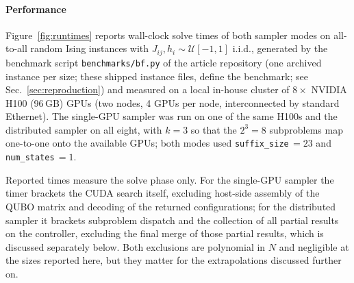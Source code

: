 \documentclass[preprint,12pt,a4paper]{elsarticle}
\begin{document}
\paragraph{Performance}
Figure~\ref{fig:runtimes} reports wall-clock solve times of both sampler modes on
all-to-all random Ising instances with $J_{ij},h_i\sim \mathcal{U}[-1,1]$ i.i.d.,
generated by the benchmark script \texttt{benchmarks/bf.py} of the article repository
(one archived instance per size; these shipped instance files,
define the benchmark; see Sec.~\ref{sec:reproduction}) and measured on a local
in-house cluster of $8\times$ NVIDIA H100 (96\,GB) GPUs (two nodes, 4 GPUs per
node, interconnected by standard Ethernet). The single-GPU sampler was run on one
of the same H100s and the distributed sampler on all eight, with $k=3$ so that
the $2^{3}=8$ subproblems map one-to-one onto the available GPUs; both modes used
\texttt{suffix\_size}\,$=23$ and \texttt{num\_states}\,$=1$.

Reported times measure the solve phase only. For the single-GPU sampler the timer
brackets the CUDA search itself, excluding host-side assembly of the QUBO matrix
and decoding of the returned configurations; for the distributed sampler it
brackets subproblem dispatch and the collection of all partial results on the
controller, excluding the final merge of those partial results, which is
discussed separately below. Both exclusions are polynomial in $N$ and negligible
at the sizes reported here, but they matter for the extrapolations discussed
further on.
\end{document}
